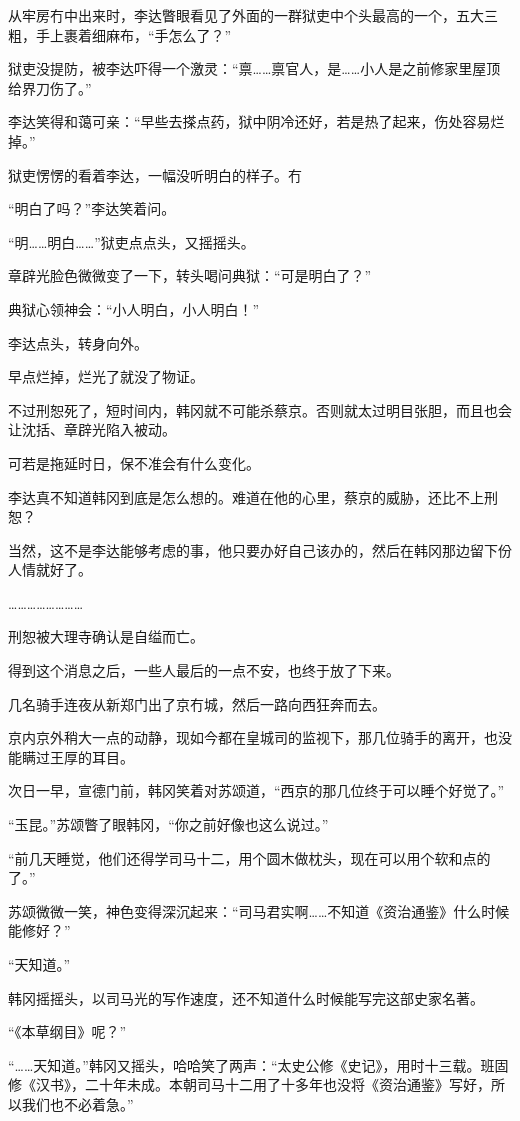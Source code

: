 从牢房冇中出来时，李达瞥眼看见了外面的一群狱吏中个头最高的一个，五大三粗，手上裹着细麻布，“手怎么了？”

狱吏没提防，被李达吓得一个激灵：“禀……禀官人，是……小人是之前修家里屋顶给界刀伤了。”

李达笑得和蔼可亲：“早些去搽点药，狱中阴冷还好，若是热了起来，伤处容易烂掉。”

狱吏愣愣的看着李达，一幅没听明白的样子。冇

“明白了吗？”李达笑着问。

“明……明白……”狱吏点点头，又摇摇头。

章辟光脸色微微变了一下，转头喝问典狱：“可是明白了？”

典狱心领神会：“小人明白，小人明白！”

李达点头，转身向外。

早点烂掉，烂光了就没了物证。

不过刑恕死了，短时间内，韩冈就不可能杀蔡京。否则就太过明目张胆，而且也会让沈括、章辟光陷入被动。

可若是拖延时日，保不准会有什么变化。

李达真不知道韩冈到底是怎么想的。难道在他的心里，蔡京的威胁，还比不上刑恕？

当然，这不是李达能够考虑的事，他只要办好自己该办的，然后在韩冈那边留下份人情就好了。

……………………

刑恕被大理寺确认是自缢而亡。

得到这个消息之后，一些人最后的一点不安，也终于放了下来。

几名骑手连夜从新郑门出了京冇城，然后一路向西狂奔而去。

京内京外稍大一点的动静，现如今都在皇城司的监视下，那几位骑手的离开，也没能瞒过王厚的耳目。

次日一早，宣德门前，韩冈笑着对苏颂道，“西京的那几位终于可以睡个好觉了。”

“玉昆。”苏颂瞥了眼韩冈，“你之前好像也这么说过。”

“前几天睡觉，他们还得学司马十二，用个圆木做枕头，现在可以用个软和点的了。”

苏颂微微一笑，神色变得深沉起来：“司马君实啊……不知道《资治通鉴》什么时候能修好？”

“天知道。”

韩冈摇摇头，以司马光的写作速度，还不知道什么时候能写完这部史家名著。

“《本草纲目》呢？”

“……天知道。”韩冈又摇头，哈哈笑了两声：“太史公修《史记》，用时十三载。班固修《汉书》，二十年未成。本朝司马十二用了十多年也没将《资治通鉴》写好，所以我们也不必着急。”

